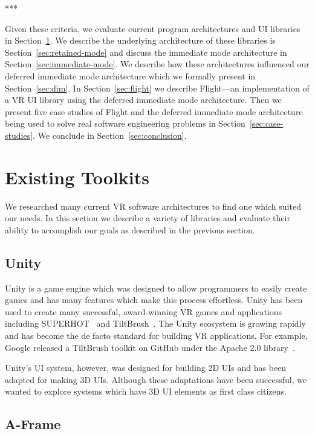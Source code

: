 \documentclass[conference,12pt]{IEEEtran}
\begin{document}
\begin{center}***\end{center}

Given these criteria, we evaluate current program architectures and UI libraries
in Section~\ref{sec:existing_tools}. We describe the underlying architecture of
these libraries is Section~\ref{sec:retained-mode} and discuss the immediate
mode architecture in Section~\ref{sec:immediate-mode}. We describe how these
architectures influenced our deferred immediate mode architecture which we
formally present in Section~\ref{sec:dim}. In Section~\ref{sec:flight} we
describe Flight---an implementation of a VR UI library using the deferred
immediate mode architecture. Then we present five case studies of Flight and
the deferred immediate mode architecture being used to solve real software
engineering problems in Section~\ref{sec:case-studies}. We conclude in
Section~\ref{sec:conclusion}.

\section{Existing Toolkits}\label{sec:existing_tools}

We researched many current VR software architectures to find one which suited
our needs. In this section we describe a variety of libraries and evaluate their
ability to accomplish our goals as described in the previous section.

\subsection{Unity}\label{sec:unity}

Unity is a game engine which was designed to allow programmers to easily create
games and has many features which make this process effortless. Unity has been
used to create many successful, award-winning VR games and applications
including SUPERHOT~\cite{UploadVR:SUPERHOT} and
TiltBrush~\cite{Unity:TiltBrush}. The Unity ecosystem is growing rapidly and has
become the de facto standard for building VR applications. For example, Google
released a TiltBrush toolkit on GitHub under the Apache 2.0
library~\cite{Google:TiltBrush}.

Unity's UI system, however, was designed for building 2D UIs and has been
adapted for making 3D UIs. Although these adaptations have been successful, we
wanted to explore systems which have 3D UI elements as first class citizens.

\subsection{A-Frame}\label{sec:aframe}
\end{document}
